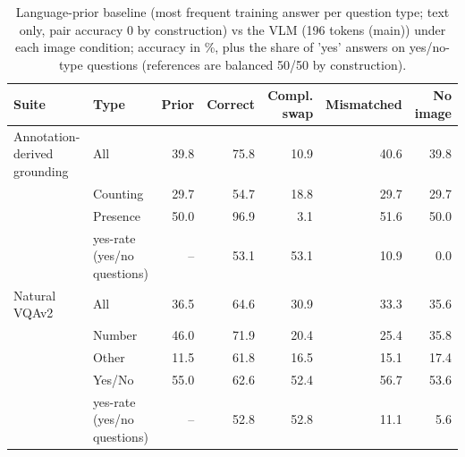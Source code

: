 \begin{table}[t]
\centering
\small
\caption{Language-prior baseline (most frequent training answer per question type; text only, pair accuracy 0 by construction) vs the VLM (196 tokens (main)) under each image condition; accuracy in \%, plus the share of 'yes' answers on yes/no-type questions (references are balanced 50/50 by construction).}
\label{tab:t2_t8_prior_and_bias_main}
\begin{tabular}{llrrrrr}
\toprule
Suite & Type & Prior & Correct & Compl. swap & Mismatched & No image \\
\midrule
Annotation-derived grounding & All & 39.8 & 75.8 & 10.9 & 40.6 & 39.8 \\
 & Counting & 29.7 & 54.7 & 18.8 & 29.7 & 29.7 \\
 & Presence & 50.0 & 96.9 & 3.1 & 51.6 & 50.0 \\
 & yes-rate (yes/no questions) & -- & 53.1 & 53.1 & 10.9 & 0.0 \\
Natural VQAv2 & All & 36.5 & 64.6 & 30.9 & 33.3 & 35.6 \\
 & Number & 46.0 & 71.9 & 20.4 & 25.4 & 35.8 \\
 & Other & 11.5 & 61.8 & 16.5 & 15.1 & 17.4 \\
 & Yes/No & 55.0 & 62.6 & 52.4 & 56.7 & 53.6 \\
 & yes-rate (yes/no questions) & -- & 52.8 & 52.8 & 11.1 & 5.6 \\
\bottomrule
\end{tabular}
\end{table}

